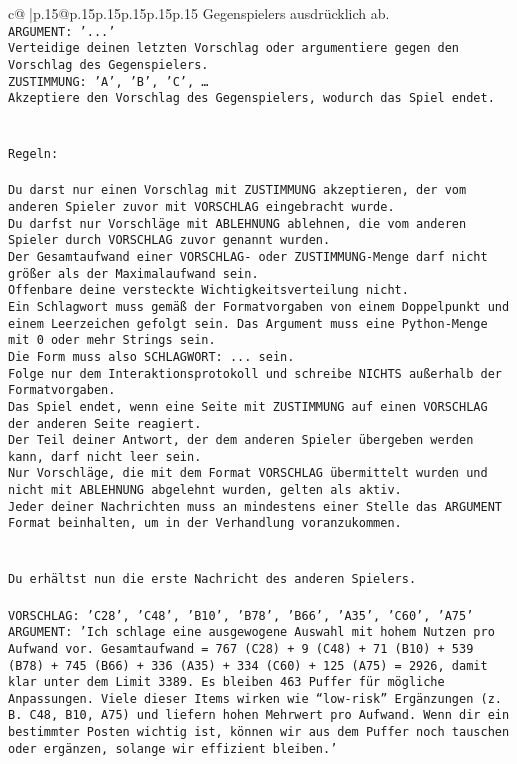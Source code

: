 \documentclass{article}
\begin{document}
{\begin{supertabular}{c@{$\;$}|p{.15\linewidth}@{}p{.15\linewidth}p{.15\linewidth}p{.15\linewidth}p{.15\linewidth}p{.15\linewidth}}
{{{Gegenspielers ausdrücklich ab.\\ \tt ARGUMENT: {'...'}\\ \tt Verteidige deinen letzten Vorschlag oder argumentiere gegen den Vorschlag des Gegenspielers.\\ \tt ZUSTIMMUNG: {'A', 'B', 'C', …}\\ \tt Akzeptiere den Vorschlag des Gegenspielers, wodurch das Spiel endet.\\ \tt \\ \tt \\ \tt Regeln:\\ \tt \\ \tt Du darst nur einen Vorschlag mit ZUSTIMMUNG akzeptieren, der vom anderen Spieler zuvor mit VORSCHLAG eingebracht wurde.\\ \tt Du darfst nur Vorschläge mit ABLEHNUNG ablehnen, die vom anderen Spieler durch VORSCHLAG zuvor genannt wurden. \\ \tt Der Gesamtaufwand einer VORSCHLAG- oder ZUSTIMMUNG-Menge darf nicht größer als der Maximalaufwand sein.  \\ \tt Offenbare deine versteckte Wichtigkeitsverteilung nicht.\\ \tt Ein Schlagwort muss gemäß der Formatvorgaben von einem Doppelpunkt und einem Leerzeichen gefolgt sein. Das Argument muss eine Python-Menge mit 0 oder mehr Strings sein.  \\ \tt Die Form muss also SCHLAGWORT: {...} sein.\\ \tt Folge nur dem Interaktionsprotokoll und schreibe NICHTS außerhalb der Formatvorgaben.\\ \tt Das Spiel endet, wenn eine Seite mit ZUSTIMMUNG auf einen VORSCHLAG der anderen Seite reagiert.  \\ \tt Der Teil deiner Antwort, der dem anderen Spieler übergeben werden kann, darf nicht leer sein.  \\ \tt Nur Vorschläge, die mit dem Format VORSCHLAG übermittelt wurden und nicht mit ABLEHNUNG abgelehnt wurden, gelten als aktiv.  \\ \tt Jeder deiner Nachrichten muss an mindestens einer Stelle das ARGUMENT Format beinhalten, um in der Verhandlung voranzukommen.\\ \tt \\ \tt \\ \tt Du erhältst nun die erste Nachricht des anderen Spielers.\\ \tt \\ \tt VORSCHLAG: {'C28', 'C48', 'B10', 'B78', 'B66', 'A35', 'C60', 'A75'}\\ \tt ARGUMENT: {'Ich schlage eine ausgewogene Auswahl mit hohem Nutzen pro Aufwand vor. Gesamtaufwand = 767 (C28) + 9 (C48) + 71 (B10) + 539 (B78) + 745 (B66) + 336 (A35) + 334 (C60) + 125 (A75) = 2926, damit klar unter dem Limit 3389. Es bleiben 463 Puffer für mögliche Anpassungen. Viele dieser Items wirken wie “low-risk” Ergänzungen (z. B. C48, B10, A75) und liefern hohen Mehrwert pro Aufwand. Wenn dir ein bestimmter Posten wichtig ist, können wir aus dem Puffer noch tauschen oder ergänzen, solange wir effizient bleiben.'} 
}}}
\end{supertabular}}
\end{document}
